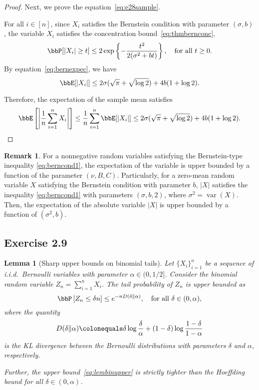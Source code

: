 \documentclass[11pt]{article}
\DeclareMathOperator{\var}{var}
\newcommand{\of}[1]{\left(#1\right)}
\newcommand{\off}[1]{\left[#1\right]}
\newcommand{\offf}[1]{\left\{#1\right\}}
\newcommand{\aabs}[1]{\left|#1\right|}
\theoremstyle{plain}
\newtheorem{lem}{Lemma}
\theoremstyle{definition}
\newtheorem{rmk}{Remark}
\begin{document}
\begin{proof}
	\vspace{0.2cm}
	Next, we prove the equation~\eqref{eq:e28sample}.
	
	\vspace{0.2cm}
	For all $i \in [n]$, since $X_i$ satisfies the Bernstein condition with parameter $(\sigma,b)$, the variable $X_i$ satisfies the concentration bound~\eqref{eq:thmbernconc},
	\begin{equation}
		\bbP[|X_i| \geq t] \leq 2 \exp \offf{- \frac{t^2}{2(\sigma^2 + bt)}}, \quad \text{for all }t \geq 0. 
	\end{equation}
	By equation~\eqref{eq:bernexpec}, we have
	\begin{equation}
		\bbE[|X_i|] \leq  2 \sigma (\sqrt{\pi} + \sqrt{\log 2}) + 4b (1 + \log 2).
	\end{equation}
	
	Therefore, the expectation of the sample mean satisfies
	\begin{equation}
		\bbE \off{ \aabs{\frac{1}{n} \sum_{i=1}^n X_i }} \leq \frac{1}{n} \sum_{i=1}^n \bbE[|X_i|] \leq 2 \sigma (\sqrt{\pi} + \sqrt{\log 2}) + 4b (1 + \log 2).
	\end{equation}
	
\end{proof}

\begin{rmk}
	For a nonnegative random variables satisfying the Bernstein-type inequality \eqref{eq:berncond1}, the expectation of the variable is upper bounded by a function of the parameter $(\nu,B,C)$. Particularly, for a zero-mean random variable $X$ satisfying the Bernstein condition with parameter $b$, $|X|$ satisfies the inequality \eqref{eq:berncond1} with parameters $(\sigma,b,2)$, where $\sigma^2 = \var(X)$.  Then, the expectation of the absolute variable $|X|$ is upper bounded by a function of $(\sigma^2, b)$. 
\end{rmk}

\subsection{Exercise 2.9}
\begin{lem}[Sharp upper bounds on binomial tails]
	Let $\{X_i\}_{i=1}^n$ be a sequence of i.i.d.\ Bernoulli variables with parameter $\alpha \in (0,1/2]$. Consider the binomial random variable $Z_n = \sum_{i=1}^n X_i$. The tail probability of $Z_n$ is upper bounded as
	\begin{equation}\label{eq:lembinupper}
		\bbP\off{Z_n \leq \delta n} \leq e^{-n D\of{\delta \Vert \alpha}}, \quad \text{for all }\delta \in (0,\alpha),
	\end{equation}
	where the quantity 
	\begin{equation}\label{eq:kldiv}
		D(\delta \Vert \alpha) \colonequals \delta \log \frac{\delta}{\alpha} + (1-\delta) \log \frac{1-\delta}{1-\alpha}
	\end{equation}
	is the KL divergence between the Bernoulli distributions with parameters $\delta$ and $\alpha$, respectively.
	
	Further, the upper bound~\eqref{eq:lembinupper} is strictly tighter than the Hoeffding bound for all $\delta \in (0,\alpha)$.
\end{lem}
\end{document}
